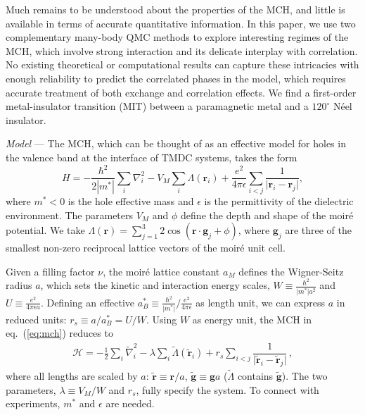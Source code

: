 \documentclass[aps,prb,showpacs,preprintnumbers,amsmath,amssymb,superscriptaddress,twocolumn]{revtex4-1}
\newcommand{\bs}{\boldsymbol}
\newcommand{\ssec}[1]{\emph{#1} ---}
\begin{document}
Much remains to be understood about the properties of the MCH, and little is available in terms of
accurate quantitative information.
In this paper,
we use two complementary many-body QMC methods to explore interesting regimes of the MCH, which involve strong interaction and its delicate interplay with correlation.
No existing theoretical or computational
results
can capture these intricacies with enough reliability to
predict the correlated phases in the model,
which requires accurate treatment of both exchange and correlation effects.
We find a first-order metal-insulator transition (MIT) between a paramagnetic metal and a $120^\circ$ N\'eel insulator.


\ssec{Model}
The MCH, which can be thought of as an effective model for holes in the valence band at the interface of
TMDC systems,
takes the form
\begin{equation} \label{eq:mch}
H =-\dfrac{\hbar^2}{2|m^*|} \sum\limits_i \nabla^2_i - V_M \sum\limits_i \Lambda(\bs{r}_i) +\dfrac{e^2}
{4\pi\epsilon}
\sum\limits_{i<j} \dfrac{1}{\vert \bs{r}_i-\bs{r}_j\vert},
\end{equation}
where $m^*<0$ is the hole effective mass and $\epsilon$ is the permittivity of the dielectric environment.
The parameters $V_M$ and $\phi$ define the depth and shape of the moir\'e potential.
We take
$\Lambda(\bs{r}) =\sum\limits_{j=1}^3 2\cos(\bs{r}\cdot\bs{g}_j+\phi)$,
where $\bs{g}_j$
are three of the smallest non-zero reciprocal lattice
vectors
of the moir\'e unit cell.

Given a filling factor $\nu$, the moir\'e lattice constant $a_M$ defines the Wigner-Seitz radius $a$,
which sets the kinetic and interaction energy scales,
$W\equiv\frac{\hbar^2}{\vert m^*\vert a^2}$ and $U\equiv\frac{e^2}{4\pi\epsilon a}$.
Defining an effective
$a_B^* \equiv \frac{\hbar^2}{\vert m^*\vert} / \frac{e^2}{4\pi\epsilon}$
as length unit, we can express $a$ in reduced units:
$r_s\equiv a/a_B^*=U/W$.
Using $W$ as energy unit, the MCH in eq.~(\ref{eq:mch}) reduces to
\begin{align} \label{eq:mch-rs}
\mathcal{H} = -\frac{1}{2}\sum\limits_i \tilde{\nabla}_i^2 - \lambda\sum\limits_i \tilde{\Lambda}(\tilde{\bs{r}}_i) + r_s\sum\limits_{i<j} \dfrac{1}{\vert \tilde{\bs{r}}_i-\tilde{\bs{r}}_j\vert}\,,
\end{align}
where
all lengths are scaled by $a$: $\tilde{\bs{r}} \equiv \bs{r}/a$, $\tilde{\bs{g}}\equiv \bs{g}a$ ($\tilde{\Lambda}$ contains $\tilde{\bs{g}}$).
The two parameters, $\lambda\equiv V_M/W$ and $r_s$, fully specify
the system. To connect with experiments, $m^*$ and $\epsilon$ are needed.
\end{document}
